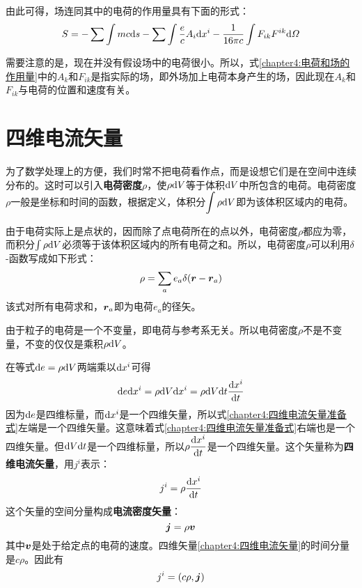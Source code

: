 由此可得，场连同其中的电荷的作用量具有下面的形式：
\begin{equation}
	S = -\sum\int mc\mathrm{d} s - \sum\int \frac{e}{c}A_i\mathrm{d} x^i - \frac{1}{16\pi c}\int F_{ik}F^{ik}\mathrm{d} \varOmega
	\label{chapter4:电荷和场的作用量}
\end{equation}

需要注意的是，现在并没有假设场中的电荷很小。所以，式\eqref{chapter4:电荷和场的作用量}中的$A_k$和$F_{ik}$是指实际的场，即外场加上电荷本身产生的场，因此现在$A_k$和$F_{ik}$与电荷的位置和速度有关。

\section{四维电流矢量}

为了数学处理上的方便，我们时常不把电荷看作点，而是设想它们是在空间中连续分布的。这时可以引入{\bf 电荷密度}$\rho$，使$\rho \mathrm{d} V$等于体积$\mathrm{d} V$中所包含的电荷。电荷密度$\rho$一般是坐标和时间的函数，根据定义，体积分$\displaystyle \int \rho \mathrm{d} V$即为该体积区域内的电荷。

由于电荷实际上是点状的，因而除了点电荷所在的点以外，电荷密度$\rho$都应为零，而积分$\int \rho \mathrm{d} V$必须等于该体积区域内的所有电荷之和。所以，电荷密度$\rho$可以利用$\delta$-函数写成如下形式：
\begin{equation}
	\rho = \sum_a e_a\delta(\boldsymbol{r}-\boldsymbol{r}_a)
	\label{chapter4:电荷系统的电荷密度}
\end{equation}
该式对所有电荷求和，$\boldsymbol{r}_a$即为电荷$e_a$的径矢。

由于粒子的电荷是一个不变量，即电荷与参考系无关。所以电荷密度$\rho$不是不变量，不变的仅仅是乘积$\rho\mathrm{d} V$。

在等式$\mathrm{d} e = \rho \mathrm{d} V$两端乘以$\mathrm{d} x^i$可得
\begin{equation}
	\mathrm{d} e\mathrm{d} x^i = \rho \mathrm{d} V \mathrm{d} x^i = \rho\mathrm{d} V\mathrm{d} t \frac{\mathrm{d} x^i}{\mathrm{d} t}
	\label{chapter4:四维电流矢量准备式}
\end{equation}
因为$\mathrm{d} e$是四维标量，而$\mathrm{d} x^i$是一个四维矢量，所以式\eqref{chapter4:四维电流矢量准备式}左端是一个四维矢量。这意味着式\eqref{chapter4:四维电流矢量准备式}右端也是一个四维矢量。但$\mathrm{d} V\mathrm{d} t$是一个四维标量，所以$\rho\dfrac{\mathrm{d} x^i}{\mathrm{d} t}$是一个四维矢量。这个矢量称为{\bf 四维电流矢量}，用$j^i$表示：
\begin{equation}
	j^i = \rho\frac{\mathrm{d} x^i}{\mathrm{d} t}
	\label{chapter4:四维电流矢量}
\end{equation}
这个矢量的空间分量构成{\bf 电流密度矢量}：
\begin{equation}
	\boldsymbol{j} = \rho\boldsymbol{v}
	\label{chapter4:电流密度矢量}
\end{equation}
其中$\boldsymbol{v}$是处于给定点的电荷的速度。四维矢量\eqref{chapter4:四维电流矢量}的时间分量是$c\rho$。因此有
\begin{equation}
	j^i = (c\rho,\boldsymbol{j})
	\label{chapter4:四维电流矢量的分量形式}
\end{equation}

